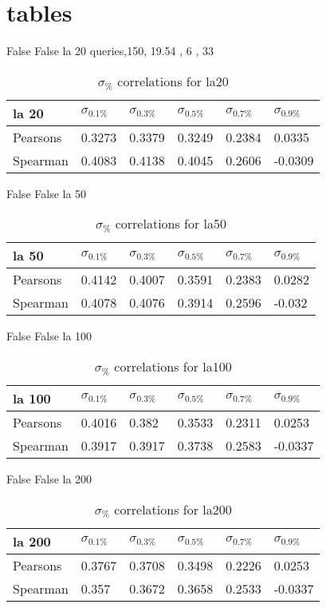 \documentclass{sig-alternate}
\begin{document}
\section{tables}
False False la 20
queries,150, 19.54 , 6 , 33
\begin{table}[h!]
\centering
\caption{$\sigma_{\%}$ correlations for la20}
\begin{tabular}{|l|l|l|l|l|l|}
\hline
la 20 & $\sigma_{0.1\%}$ & $\sigma_{0.3\%}$ & $\sigma_{0.5\%}$ & $\sigma_{0.7\%}$ & $\sigma_{0.9\%}$ \\ \hline
Pearsons  & 0.3273 & 0.3379 & 0.3249 & 0.2384 & 0.0335 \\ \hline
Spearman  & 0.4083 & 0.4138 & 0.4045 & 0.2606 & -0.0309 \\ \hline
\end{tabular}
\end{table}
False False la 50
\begin{table}[h!]
\centering
\caption{$\sigma_{\%}$ correlations for la50}
\begin{tabular}{|l|l|l|l|l|l|}
\hline
la 50 & $\sigma_{0.1\%}$ & $\sigma_{0.3\%}$ & $\sigma_{0.5\%}$ & $\sigma_{0.7\%}$ & $\sigma_{0.9\%}$ \\ \hline
Pearsons  & 0.4142 & 0.4007 & 0.3591 & 0.2383 & 0.0282 \\ \hline
Spearman  & 0.4078 & 0.4076 & 0.3914 & 0.2596 & -0.032 \\ \hline
\end{tabular}
\end{table}
False False la 100
\begin{table}[h!]
\centering
\caption{$\sigma_{\%}$ correlations for la100}
\begin{tabular}{|l|l|l|l|l|l|}
\hline
la 100 & $\sigma_{0.1\%}$ & $\sigma_{0.3\%}$ & $\sigma_{0.5\%}$ & $\sigma_{0.7\%}$ & $\sigma_{0.9\%}$ \\ \hline
Pearsons  & 0.4016 & 0.382 & 0.3533 & 0.2311 & 0.0253 \\ \hline
Spearman  & 0.3917 & 0.3917 & 0.3738 & 0.2583 & -0.0337 \\ \hline
\end{tabular}
\end{table}
False False la 200
\begin{table}[h!]
\centering
\caption{$\sigma_{\%}$ correlations for la200}
\begin{tabular}{|l|l|l|l|l|l|}
\hline
la 200 & $\sigma_{0.1\%}$ & $\sigma_{0.3\%}$ & $\sigma_{0.5\%}$ & $\sigma_{0.7\%}$ & $\sigma_{0.9\%}$ \\ \hline
Pearsons  & 0.3767 & 0.3708 & 0.3498 & 0.2226 & 0.0253 \\ \hline
Spearman  & 0.357 & 0.3672 & 0.3658 & 0.2533 & -0.0337 \\ \hline
\end{tabular}
\end{table}
\end{document}
